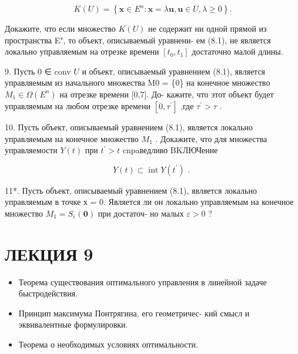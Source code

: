 \documentclass[8pt]{extarticle}
\begin{document}
\[
K\left( U\right)  = \left\{  {\mathbf{x} \in  {E}^{n} : \mathbf{x} = \lambda \mathbf{u},\mathbf{u} \in  U,\lambda  \geq  0}\right\}  .
\]

Докажите, что если множество \(K\left( U\right)\) не содержит ни одной прямой из пространства E", то объект, описываемый уравнени- ем (8.1), не является локально управляемым на отрезке времени \(\left\lbrack  {{t}_{0},{t}_{1}}\right\rbrack\) достаточно малой длины.

9. Пусть 0 ∈ conv \(U\) и объект, описываемый уравнением (8.1), является управляемым из начального множества M0 = \{0\} на конечное множество \({M}_{1} \in  \Omega \left( {E}^{n}\right)\) на отрезке времени [0,7]. До- кажите, что этот объект будет управляемым на любом отрезке времени \(\left\lbrack  {0,{\tau }^{\prime }}\right\rbrack\) ,где \({\tau }^{\prime } > \tau\) .

10. Пусть объект, описываемый уравнением (8.1), является локально управляемым на конечное множество \({M}_{1}\) . Докажите, что для множества управляемости \(Y\left( t\right)\) при \({t}^{\prime } > t\) cnpaведливо BKЛЮЧение

\[
Y\left( t\right)  \subset  \operatorname{int}Y\left( {t}^{\prime }\right) \text{ . }
\]

11*. Пусть объект, описываемый уравнением (8.1), является локально управляемым в точке х = 0. Является ли он локально управляемым на конечное множество \({M}_{1} = {S}_{\varepsilon }\left( \mathbf{0}\right)\) при достаточ- но малых \(\varepsilon  > 0\) ?

\section*{ЛЕКЦИЯ 9}

\begin{itemize}\relax
\item\relax Теорема существования оптимального управления в линейной задаче быстродействия.
\end{itemize}

\begin{itemize}\relax
\item\relax Принцип максимума Понтрягина, его геометричес- кий смысл и эквивалентные формулировки.
\end{itemize}

\begin{itemize}\relax
\item\relax Теорема о необходимых условиях оптимальности.
\end{itemize}
\end{document}
